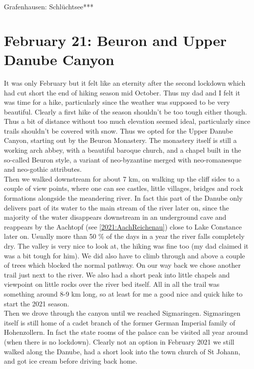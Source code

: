 Grafenhausen: Schl\"uchtsee***

\section{February 21: Beuron and Upper Danube Canyon}
\label{2021:Beuron}

It was only February but it felt like an eternity after the second lockdown which had cut short the end of hiking season mid October. Thus my dad and I felt it was time for a hike, particularly since the weather was supposed to be very beautiful. Clearly a first hike of the season shouldn't be too tough either though. Thus a bit of distance without too much elevation seemed ideal, particularly since trails shouldn't be covered with snow. Thus we opted for the Upper Danube Canyon, starting out by the Beuron Monastery. The monastery itself is still a working arch abbey, with a beautiful baroque church, and a chapel built in the so-called Beuron style, a variant of neo-byzantine merged with neo-romanesque and neo-gothic attributes. \\
Then we walked downstream for about 7 km, on walking up the cliff sides to a couple of view points, where one can see castles, little villages, bridges and rock formations alongside the meandering river. In fact this part of the Danube only delivers part of its water to the main stream of the river later on, since the majority of the water disappears downstream  in an underground cave and reappears by the Aachtopf (see \ref{2021:AachReichenau}) close to Lake Constance later on. Usually more than 50 \% of the days in a year the river falls completely dry. The valley is very nice to look at, the hiking was fine too (my dad claimed it was a bit tough for him). We did also have to climb through and above a couple of trees which blocked the normal pathway. On our way back we chose another trail just next to the river. We also had a short peak into little chapels and viewpoint on little rocks over the river bed itself. All in all the trail was something around 8-9 km long, so at least for me a good nice and quick hike to start the 2021 season.\\
Then we drove through the canyon until we reached Sigmaringen. Sigmaringen itself is still home of a cadet branch of the former German Imperial family of Hohenzollern. In fact the state rooms of the palace can be visited all year around (when there is no lockdown). Clearly not an option in February 2021 we still walked along the Danube, had a short look into the town church of St Johann, and got ice cream before driving back home.  \\ 

